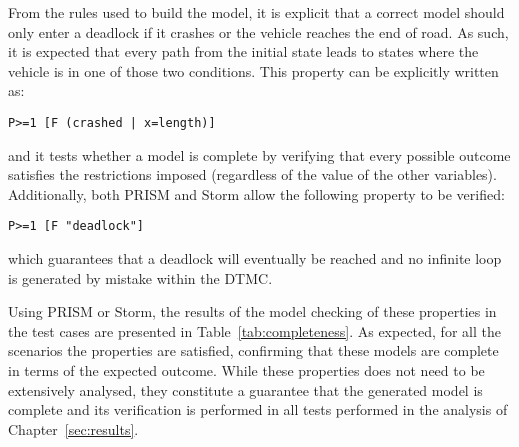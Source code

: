From the rules used to build the model, it is explicit that a correct model should only enter a deadlock if it crashes or the vehicle reaches the end of road. As such, it is expected that every path from the initial state leads to states where the vehicle is in one of those two conditions. This property can be explicitly written as:

\begin{minipage}{\linewidth}
{\vspace{1em}
\begin{lstlisting}
P>=1 [F (crashed | x=length)]
\end{lstlisting}
}
\end{minipage}

and it tests whether a model is complete by verifying that every possible outcome satisfies the restrictions imposed (regardless of the value of the other variables). Additionally, both PRISM and Storm allow the following property to be verified:

\begin{minipage}{\linewidth}
{\vspace{1em}
\begin{lstlisting}
P>=1 [F "deadlock"]
\end{lstlisting}
}
\end{minipage}

which guarantees that a deadlock will eventually be reached and no infinite loop  is generated by mistake within the DTMC.

Using PRISM or Storm, the results of the model checking of these properties in the test cases are presented in Table~\ref{tab:completeness}. As expected, for all the scenarios the properties are satisfied, confirming that these models are complete in terms of the expected outcome. While these properties does not need to be extensively analysed, they constitute a guarantee that the generated model is complete and its verification is performed in all tests performed in the analysis of Chapter~\ref{sec:results}.

